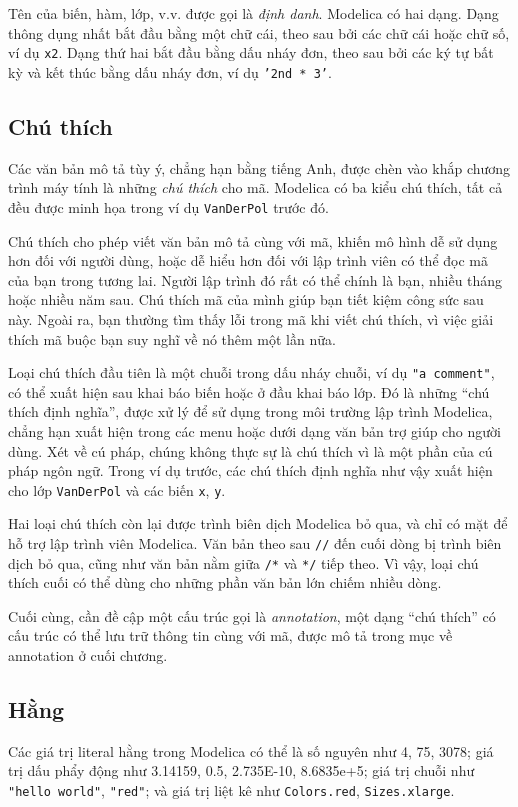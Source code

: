 Tên của biến, hàm, lớp, v.v. được gọi là \emph{định danh}. Modelica có hai dạng. Dạng thông dụng nhất bắt đầu bằng một chữ cái, theo sau bởi các chữ cái hoặc chữ số, ví dụ \texttt{x2}. Dạng thứ hai bắt đầu bằng dấu nháy đơn, theo sau bởi các ký tự bất kỳ và kết thúc bằng dấu nháy đơn, ví dụ \texttt{'2nd * 3'}.

\subsection{Chú thích}
Các văn bản mô tả tùy ý, chẳng hạn bằng tiếng Anh, được chèn vào khắp chương trình máy tính là những \emph{chú thích} cho mã. Modelica có ba kiểu chú thích, tất cả đều được minh họa trong ví dụ \texttt{VanDerPol} trước đó.

Chú thích cho phép viết văn bản mô tả cùng với mã, khiến mô hình dễ sử dụng hơn đối với người dùng, hoặc dễ hiểu hơn đối với lập trình viên có thể đọc mã của bạn trong tương lai. Người lập trình đó rất có thể chính là bạn, nhiều tháng hoặc nhiều năm sau. Chú thích mã của mình giúp bạn tiết kiệm công sức sau này. Ngoài ra, bạn thường tìm thấy lỗi trong mã khi viết chú thích, vì việc giải thích mã buộc bạn suy nghĩ về nó thêm một lần nữa.

Loại chú thích đầu tiên là một chuỗi trong dấu nháy chuỗi, ví dụ \texttt{"a comment"}, có thể xuất hiện sau khai báo biến hoặc ở đầu khai báo lớp. Đó là những ``chú thích định nghĩa'', được xử lý để sử dụng trong môi trường lập trình Modelica, chẳng hạn xuất hiện trong các menu hoặc dưới dạng văn bản trợ giúp cho người dùng. Xét về cú pháp, chúng không thực sự là chú thích vì là một phần của cú pháp ngôn ngữ. Trong ví dụ trước, các chú thích định nghĩa như vậy xuất hiện cho lớp \texttt{VanDerPol} và các biến \texttt{x}, \texttt{y}.

Hai loại chú thích còn lại được trình biên dịch Modelica bỏ qua, và chỉ có mặt để hỗ trợ lập trình viên Modelica. Văn bản theo sau \texttt{//} đến cuối dòng bị trình biên dịch bỏ qua, cũng như văn bản nằm giữa \texttt{/*} và \texttt{*/} tiếp theo. Vì vậy, loại chú thích cuối có thể dùng cho những phần văn bản lớn chiếm nhiều dòng.

Cuối cùng, cần đề cập một cấu trúc gọi là \emph{annotation}, một dạng ``chú thích'' có cấu trúc có thể lưu trữ thông tin cùng với mã, được mô tả trong mục về annotation ở cuối chương.

\subsection{Hằng}
Các giá trị literal hằng trong Modelica có thể là số nguyên như 4, 75, 3078; giá trị dấu phẩy động như 3.14159, 0.5, 2.735E-10, 8.6835e+5; giá trị chuỗi như \texttt{"hello world"}, \texttt{"red"}; và giá trị liệt kê như \texttt{Colors.red}, \texttt{Sizes.xlarge}.

